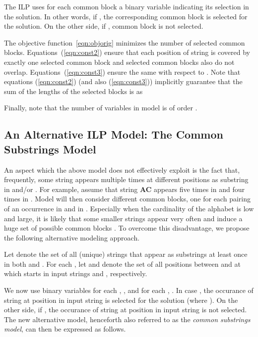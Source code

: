 \documentclass[11pt,a4paper]{article}
\begin{document}
The ILP uses for each common block  a binary variable  indicating its selection in the solution. In other words, if , the corresponding common block  is selected for the solution. On the other side, if , common block  is not selected.




The objective function~\eqref{eqn:objorig} minimizes the number of selected common
blocks. Equations~(\ref{eqn:const2}) ensure that each position
 of string  is covered by exactly one selected common block
and selected common blocks also do not overlap.
Equations~(\ref{eqn:const3}) ensure the same with respect to . 
Note that equations (\ref{eqn:const2}) (and also (\ref{eqn:const3})) implicitly
guarantee that the sum of the lengths of the selected blocks is  as

Finally, note that the number of variables in model  is of order .

\subsection{An Alternative ILP Model: The Common Substrings Model}

An aspect which the above model does not effectively exploit is the fact that,
frequently, some string appears multiple times at different positions
as substring in  and/or . 
For example, assume that string \textbf{AC} appears five times in  and
four times in . Model  will then
consider  different common blocks, one for each pairing of
an occurrence in  and in . Especially when the cardinality of the
alphabet is low and  large, it is likely that some smaller strings
appear very often and induce a huge set of possible common blocks .
To overcome this disadvantage, we propose the following alternative
modeling approach.

Let  denote the set of all (unique) strings that appear as substrings
at least once in both  and . For each , let 
and  denote the set of all positions between 
and  at which  starts in input strings  and ,
respectively.


We now use binary variables  for each , , and  for each , . In case , the occurance of string  at position  in input string  is selected for the solution (where ). On the other side, if , the occurance of string  at position  in input string  is not selected. The new alternative model, henceforth also referred to as the \emph{common substrings model}, can then be expressed as follows.
\end{document}
